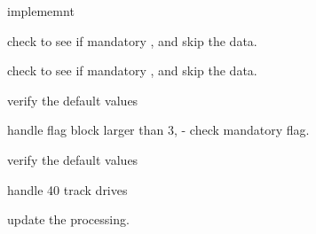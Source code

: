 \begin{DoxyRefList}
implememnt  
\item[\label{todo__todo000010}%
\hypertarget{todo__todo000010}{}%
Global \hyperlink{classH17Disk_ab5299643ce037fb442e0ccb21cb80c5f}{H17\+Disk\+:\+:load\+Block} (unsigned char buf\mbox{[}\mbox{]}, unsigned int size, unsigned int \&length)]check to see if mandatory , and skip the data.  
\item[\label{todo__todo000009}%
\hypertarget{todo__todo000009}{}%
Global \hyperlink{classH17Disk_a29f4d35fba24f0d9cee37bcb02120a6c}{H17\+Disk\+:\+:validate\+Block} (unsigned char buf\mbox{[}\mbox{]}, unsigned int size, unsigned int \&length)]check to see if mandatory , and skip the data.  
\item[\label{todo__todo000007}%
\hypertarget{todo__todo000007}{}%
Global \hyperlink{classH17DiskFlagsBlock_a335188fe3afe1ac2dea9bd64da8bd498}{H17\+Disk\+Flags\+Block\+:\+:H17\+Disk\+Flags\+Block} (uint8\+\_\+t buf\mbox{[}\mbox{]}, uint32\+\_\+t size)]verify the default values 

handle flag block larger than 3, -\/ check mandatory flag.  
\item[\label{todo__todo000006}%
\hypertarget{todo__todo000006}{}%
Global \hyperlink{classH17DiskFlagsBlock_ab22af88da1209fa46912ae9d59566299}{H17\+Disk\+Flags\+Block\+:\+:H17\+Disk\+Flags\+Block} (bool write\+Protect, uint8\+\_\+t distribution, uint8\+\_\+t track\+Source)]verify the default values  
\item[\label{todo__todo000014}%
\hypertarget{todo__todo000014}{}%
Global \hyperlink{classHeathHSDisk_a0fa1e73a54c10657388f4739631832fb}{Heath\+H\+S\+Disk\+:\+:physical\+Track} (B\+Y\+T\+E track)]handle 40 track drives 
\item[\label{todo__todo000005}%
\hypertarget{todo__todo000005}{}%
global\+Scope$>$ Global \hyperlink{disk__util_8h_a6fe02d4965ce98f778a023f33b99a653}{shift\+Byte} (B\+Y\+T\+E first, B\+Y\+T\+E second, B\+Y\+T\+E shift)]update the processing. 
\end{DoxyRefList}